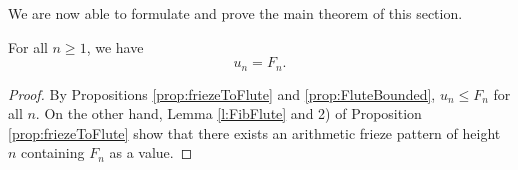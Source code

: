 We are now able to formulate and prove the main theorem of this section.
\begin{theorem}
    \label{mainTheorem}
    For all $n \geq 1$, we have 
    \[
        u_n = F_{n}.
    \]    
\end{theorem}
\begin{proof}
By Propositions \ref{prop:friezeToFlute} and \ref{prop:FluteBounded}, $u_n \leq F_n$ for all $n$. 
On the other hand, Lemma \ref{l:FibFlute} and 2) of Proposition \ref{prop:friezeToFlute} show that 
there exists an arithmetic frieze pattern of height $n$ containing $F_n$ as a value.
\end{proof}







